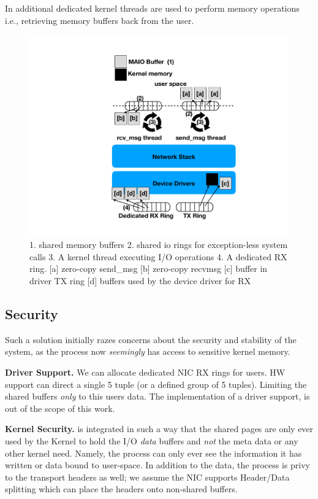 In additional dedicated kernel threads are used to perform memory operations i.e., retrieving memory buffers back from the user.%

\begin{figure}[t]
    \centering
    \includegraphics[width=0.8\columnwidth]{ktcp_z.pdf}
    \caption{1. \oursys shared memory buffers 2. shared io rings for exception-less system calls 3. A kernel thread executing I/O operations 4. A dedicated RX ring.
    [a] zero-copy send\_msg [b] zero-copy recvmsg [c] \oursys buffer in driver TX ring [d] \oursys buffers used by the device driver for RX}
    \label{fig:our_sys}
\end{figure} 

\subsection{Security}
Such a solution initially razes concerns about the security and stability of the system, as the process now \emph{seemingly} has access to sensitive kernel memory. 

\noindent\textbf{Driver Support.} We can allocate dedicated NIC RX rings for \oursys users. HW support\cite{flow_direct} can direct a single 5 tuple (or a defined group of 5 tuples). Limiting the shared buffers \emph{only} to this users data. The implementation of a driver support, is out of the scope of this work. 

\noindent\textbf{Kernel Security.} \oursys is integrated in such a way that the shared pages are only ever used by the Kernel to hold the I/O \emph{data} buffers and \emph{not} the meta data or any other kernel need. Namely, the process can only ever see the information it has written or data bound to user-space. In addition to the data, the process is privy to the transport headers as well; we assume the NIC supports Header/Data splitting\cite{hds} which can place the headers onto non-shared buffers.

